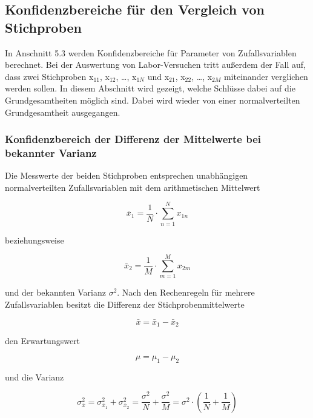 \clearpage

\subsection{Konfidenzbereiche f\"{u}r den Vergleich von Stichproben}

\noindent In Anschnitt 5.3 werden Konfidenzbereiche f\"{u}r Parameter von Zufallsvariablen berechnet. Bei der Auswertung von Labor-Versuchen tritt au{\ss}erdem der Fall auf, dass zwei Stichproben x$_{11}$, x$_{12}$, {\dots}, x$_{1N}$ und x$_{21}$, x$_{22}$, {\dots}, x$_{2M}$ miteinander verglichen werden sollen. In diesem Abschnitt wird gezeigt, welche Schl\"{u}sse dabei auf die Grundgesamtheiten m\"{o}glich sind. Dabei wird wieder von einer normalverteilten Grundgesamtheit ausgegangen.

\subsubsection{Konfidenzbereich der Differenz der Mittelwerte bei bekannter Varianz}

\noindent Die Messwerte der beiden Stichproben entsprechen unabh\"{a}ngigen normalverteilten Zufallsvariablen mit dem arithmetischen Mittelwert

\begin{equation}\label{eq:fivesixty}
\bar{x}_{1} =\dfrac{1}{N} \cdot \sum _{n=1}^{N}x_{1n}
\end{equation}

\noindent beziehungsweise

\begin{equation}\label{eq:fivesixtyone}
\bar{x}_{2} =\dfrac{1}{M} \cdot \sum _{m=1}^{M}x_{2m}
\end{equation}

und der bekannten Varianz $\sigma^{2}$. Nach den Rechenregeln f\"{u}r mehrere Zufallsvariablen besitzt die Differenz der Stichprobenmittelwerte 

\begin{equation}\label{eq:fivesixtytwo}
\bar{x}=\bar{x}_{1} -\bar{x}_{2}
\end{equation}

\noindent den Erwartungswert 

\begin{equation}\label{eq:fivesixtythree}
\mu =\mu _{1} -\mu _{2}
\end{equation}

\noindent und die Varianz 

\begin{equation}\label{eq:fivesixtyfour}
\sigma _{\bar{x}}^{2} =\sigma _{\bar{x}_{1} }^{2} +\sigma _{\bar{x}_{2} }^{2} =\dfrac{\sigma ^{2} }{N} +\dfrac{\sigma ^{2} }{M} =\sigma ^{2} \cdot \left(\dfrac{1}{N} +\dfrac{1}{M} \right)
\end{equation}

